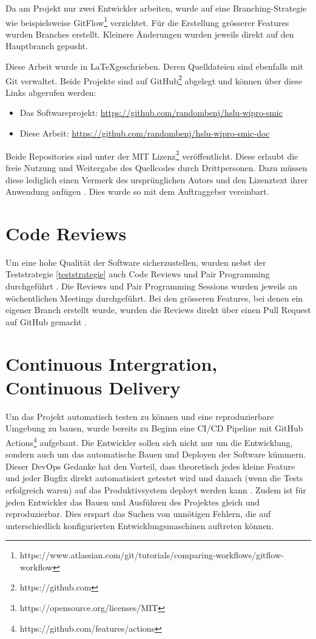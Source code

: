 Da am Projekt nur zwei Entwickler arbeiten,
wurde auf eine Branching-Strategie wie beispielsweise
GitFlow\footnote{https://www.atlassian.com/git/tutorials/comparing-workflows/gitflow-workflow} verzichtet.
Für die Erstellung grösserer Features wurden Branches erstellt.
Kleinere Änderungen wurden jeweils direkt auf den Hauptbranch gepusht.

Diese Arbeit wurde in \LaTeX geschrieben. Deren Quelldateien sind ebenfalls mit Git verwaltet.
Beide Projekte sind auf GitHub\footnote{https://github.com} abgelegt und können über diese Links abgerufen werden:

\begin{itemize}
      \item Das Softwareprojekt: \url{https://github.com/randombenj/hslu-wipro-smic}
      \item Diese Arbeit: \url{https://github.com/randombenj/hslu-wipro-smic-doc}
\end{itemize}

Beide Repositories sind unter der MIT Lizenz\footnote{https://opensource.org/licenses/MIT} veröffentlicht.
Diese erlaubt die freie Nutzung und Weitergabe des Quellcodes durch Drittpersonen.
Dazu müssen diese lediglich einen Vermerk des ursprünglichen Autors und den Lizenztext ihrer Anwendung anfügen \parencite{mit_licence}.
Dies wurde so mit dem Auftraggeber vereinbart.

\section{Code Reviews}

Um eine hohe Qualität der Software sicherzustellen, wurden nebst der Teststrategie \ref{teststrategie}
auch Code Reviews und Pair Programming durchgeführt \parencite{fu2017code}.
Die Reviews und Pair Programming Sessions wurden jeweils an wöchentlichen
Meetings durchgeführt.
Bei den grösseren Features, bei denen ein eigener Branch erstellt wurde, wurden die
Reviews direkt über einen Pull Request auf GitHub gemacht \parencite{github_flow_docs_2021}.

\section{Continuous Intergration, Continuous Delivery}

Um das Projekt automatisch testen zu können und eine reproduzierbare Umgebung zu bauen,
wurde bereits zu Beginn eine \ac{CI/CD} Pipeline mit GitHub Actions\footnote{https://github.com/features/actions}
aufgebaut.
Die Entwickler sollen sich nicht nur um die Entwicklung, sondern auch um das automatische Bauen und Deployen der
Software kümmern. Dieser DevOps Gedanke hat den Vorteil, dass
theoretisch jedes kleine Feature und jeder Bugfix direkt automatisiert getestet
wird und danach (wenn die Tests erfolgreich waren) auf das Produktivsystem
deployt werden kann \parencite{what_is_devops}.
Zudem ist für jeden Entwickler das Bauen und Ausführen des Projektes gleich und
reproduzierbar. Dies erspart das Suchen von unnötigen Fehlern, die auf unterschiedlich
konfigurierten Entwicklungsmaschinen auftreten können.
